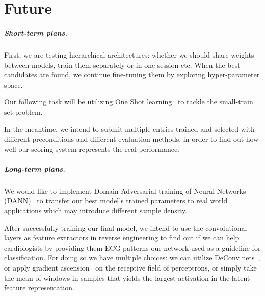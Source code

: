 \chapter{Future}

\paragraph{Short-term plans.}
First, we are testing hierarchical architectures: whether we should share weights between models, train them separately or in one session etc.
When the best candidates are found, we continue fine-tuning them by exploring hyper-parameter space.

Our following task will be utilizing One Shot learning~\cite{santoro_one-shot_2016, vinyals_matching_2016} to tackle the small-train set problem.

In the meantime, we intend to submit multiple entries trained and selected with different preconditions and different evaluation methods, in order to find out how well our scoring system represents the real performance.


\paragraph{Long-term plans.}
We would like to implement Domain Adversarial training of Neural Networks (DANN)~\cite{ganin_domain-adversarial_2015} to transfer our best model's trained parameters to real world applications which may introduce different sample density.

After successfully training our final model, we intend to use the convolutional layers as feature extractors in reverse engineering to find out if we can help cardiologists by providing them ECG patterns our network used as a guideline for classification.
For doing so we have multiple choices: we can utilize DeConv nets~\cite{zeiler2014visualizing}, or apply gradient ascension~\cite{yosinski2015understanding} on the receptive field of perceptrons, or simply take the mean of windows in samples that yields the largest activation in the latent feature representation.
